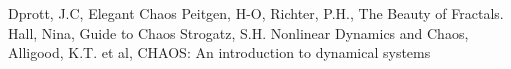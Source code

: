 \newpage

\begin{thebibliography}{1}
Dprott, J.C, Elegant Chaos
Peitgen, H-O, Richter, P.H., The Beauty of Fractals.
Hall, Nina, Guide to Chaos
Strogatz, S.H. Nonlinear Dynamics and Chaos,
Alligood, K.T. et al, CHAOS: An introduction to dynamical systems
\end{thebibliography}

